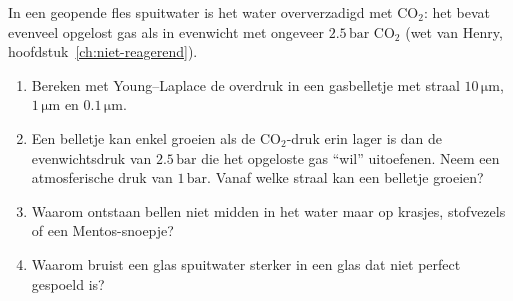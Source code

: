 \begin{oefening}
In een geopende fles spuitwater is het water oververzadigd met \(\mathrm{CO_2}\): het bevat evenveel opgelost gas als in evenwicht met ongeveer \(2.5\,\mathrm{bar}\) \(\mathrm{CO_2}\) (wet van Henry, hoofdstuk~\ref{ch:niet-reagerend}).

\begin{enumerate}
\item[(a)]
  Bereken met Young--Laplace de overdruk in een gasbelletje met straal \(10\,\mathrm{\mu m}\), \(1\,\mathrm{\mu m}\) en \(0.1\,\mathrm{\mu m}\).
\item[(b)]
  Een belletje kan enkel groeien als de \(\mathrm{CO_2}\)-druk erin lager is dan de evenwichtsdruk van \(2.5\,\mathrm{bar}\) die het opgeloste gas ``wil'' uitoefenen. Neem een atmosferische druk van \(1\,\mathrm{bar}\). Vanaf welke straal kan een belletje groeien?
\item[(c)]
  Waarom ontstaan bellen niet midden in het water maar op krasjes, stofvezels of een Mentos-snoepje?
\item[(d)]
  Waarom bruist een glas spuitwater sterker in een glas dat niet perfect gespoeld is?
\end{enumerate}
\end{oefening}
